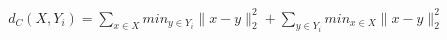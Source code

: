 \documentclass[preview]{standalone}
\begin{document}
\begin{align*}
d_C(X,Y_i) = \sum_{x \in X} min_{y \in Y_i} \| x-y \|_2^2 + \sum_{y \in Y_i} min_{x \in X} \| x-y \|_2^2
\end{align*}
\end{document}
